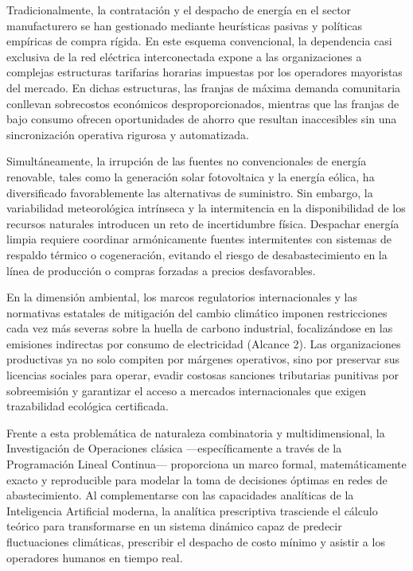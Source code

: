 \documentclass[11pt,a4paper]{article}
\begin{document}
Tradicionalmente, la contratación y el despacho de energía en el sector manufacturero se han gestionado mediante heurísticas pasivas y políticas empíricas de compra rígida. En este esquema convencional, la dependencia casi exclusiva de la red eléctrica interconectada expone a las organizaciones a complejas estructuras tarifarias horarias impuestas por los operadores mayoristas del mercado. En dichas estructuras, las franjas de máxima demanda comunitaria conllevan sobrecostos económicos desproporcionados, mientras que las franjas de bajo consumo ofrecen oportunidades de ahorro que resultan inaccesibles sin una sincronización operativa rigurosa y automatizada.

Simultáneamente, la irrupción de las fuentes no convencionales de energía renovable, tales como la generación solar fotovoltaica y la energía eólica, ha diversificado favorablemente las alternativas de suministro. Sin embargo, la variabilidad meteorológica intrínseca y la intermitencia en la disponibilidad de los recursos naturales introducen un reto de incertidumbre física. Despachar energía limpia requiere coordinar armónicamente fuentes intermitentes con sistemas de respaldo térmico o cogeneración, evitando el riesgo de desabastecimiento en la línea de producción o compras forzadas a precios desfavorables.

En la dimensión ambiental, los marcos regulatorios internacionales y las normativas estatales de mitigación del cambio climático imponen restricciones cada vez más severas sobre la huella de carbono industrial, focalizándose en las emisiones indirectas por consumo de electricidad (Alcance 2). Las organizaciones productivas ya no solo compiten por márgenes operativos, sino por preservar sus licencias sociales para operar, evadir costosas sanciones tributarias punitivas por sobreemisión y garantizar el acceso a mercados internacionales que exigen trazabilidad ecológica certificada.

Frente a esta problemática de naturaleza combinatoria y multidimensional, la Investigación de Operaciones clásica —específicamente a través de la Programación Lineal Continua— proporciona un marco formal, matemáticamente exacto y reproducible para modelar la toma de decisiones óptimas en redes de abastecimiento. Al complementarse con las capacidades analíticas de la Inteligencia Artificial moderna, la analítica prescriptiva trasciende el cálculo teórico para transformarse en un sistema dinámico capaz de predecir fluctuaciones climáticas, prescribir el despacho de costo mínimo y asistir a los operadores humanos en tiempo real.
\end{document}
